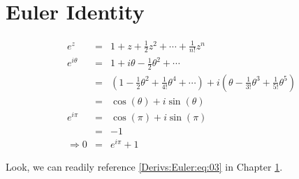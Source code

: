 \section{Euler Identity}
\label{Derivs:Euler:S}

\begin{eqnarray}
e^z&=&1+z+\frac{1}{2}z^2+\cdots + \frac{1}{n!} z^n\label{Derivs:Euler:eq:01}\\
e^{i\theta}&=&1+i\theta -\frac{1}{2}\theta^2 +\cdots\nonumber\\
&=&(1-\frac{1}{2}\theta^2 +\frac{1}{4!}\theta^4+\cdots)+i(\theta -\frac{1}{3!}\theta^3+\frac{1}{5!}\theta^5)\nonumber\\
&=&\cos(\theta)+i\sin(\theta) \label{Derivs:Euler:eq:02}\\
e^{i\pi}&=&\cos(\pi)+i\sin(\pi)\nonumber\\
&=&-1 \\
\Rightarrow 0&=&e^{i\pi}+1 \label{Derivs:Euler:eq:04}
\end{eqnarray}

Look, we can readily reference \eqref{Derivs:Euler:eq:03} in Chapter \ref{Derivs:Euler:S}.